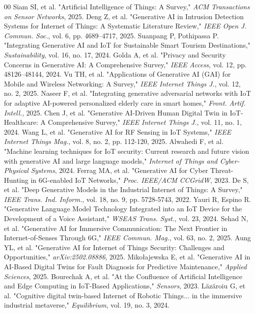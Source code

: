 \documentclass[journal]{IEEEtran}
\begin{document}
\begin{thebibliography}{00}
 Siam SI, et al. "Artificial Intelligence of Things: A Survey," \textit{ACM Transactions on Sensor Networks}, 2025.
 Deng Z, et al. "Generative AI in Intrusion Detection Systems for Internet of Things: A Systematic Literature Review," \textit{IEEE Open J. Commun. Soc.}, vol. 6, pp. 4689–4717, 2025.
 Suanpang P, Pothipassa P. "Integrating Generative AI and IoT for Sustainable Smart Tourism Destinations," \textit{Sustainability}, vol. 16, no. 17, 2024.
 Golda A, et al. "Privacy and Security Concerns in Generative AI: A Comprehensive Survey," \textit{IEEE Access}, vol. 12, pp. 48126–48144, 2024.
 Vu TH, et al. "Applications of Generative AI (GAI) for Mobile and Wireless Networking: A Survey," \textit{IEEE Internet Things J.}, vol. 12, no. 2, 2025.
 Naseer F, et al. "Integrating generative adversarial networks with IoT for adaptive AI-powered personalized elderly care in smart homes," \textit{Front. Artif. Intell.}, 2025.
 Chen J, et al. "Generative AI-Driven Human Digital Twin in IoT-Healthcare: A Comprehensive Survey," \textit{IEEE Internet Things J.}, vol. 11, no. 1, 2024.
 Wang L, et al. "Generative AI for RF Sensing in IoT Systems," \textit{IEEE Internet Things Mag.}, vol. 8, no. 2, pp. 112-120, 2025.
 Alwahedi F, et al. "Machine learning techniques for IoT security: Current research and future vision with generative AI and large language models," \textit{Internet of Things and Cyber-Physical Systems}, 2024.
 Ferrag MA, et al. "Generative AI for Cyber Threat-Hunting in 6G-enabled IoT Networks," \textit{Proc. IEEE/ACM CCGridW}, 2023.
 De S, et al. "Deep Generative Models in the Industrial Internet of Things: A Survey," \textit{IEEE Trans. Ind. Inform.}, vol. 18, no. 9, pp. 5728-5743, 2022.
 Yauri R, Espino R. "Generative Language Model Technology Integrated into an IoT Device for the Development of a Voice Assistant," \textit{WSEAS Trans. Syst.}, vol. 23, 2024.
 Sehad N, et al. "Generative AI for Immersive Communication: The Next Frontier in Internet-of-Senses Through 6G," \textit{IEEE Commun. Mag.}, vol. 63, no. 2, 2025.
 Aung YL, et al. "Generative AI for Internet of Things Security: Challenges and Opportunities," \textit{arXiv:2502.08886}, 2025.
 Mikołajewska E, et al. "Generative AI in AI-Based Digital Twins for Fault Diagnosis for Predictive Maintenance," \textit{Applied Sciences}, 2025.
 Bourechak A, et al. "At the Confluence of Artificial Intelligence and Edge Computing in IoT-Based Applications," \textit{Sensors}, 2023.
 Lăzăroiu G, et al. "Cognitive digital twin-based Internet of Robotic Things... in the immersive industrial metaverse," \textit{Equilibrium}, vol. 19, no. 3, 2024.

\end{thebibliography}
\end{document}

